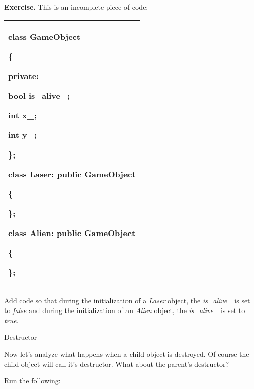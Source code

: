 \documentclass[
]{article}
\begin{document}
\textbf{Exercise.} This is an incomplete piece of code:

\begin{longtable}[]{@{}l@{}}
\toprule
\endhead
\begin{minipage}[t]{0.97\columnwidth}\raggedright
class GameObject

\{

private:

bool is\_alive\_;

int x\_;

int y\_;

\};

class Laser: public GameObject

\{

\};

class Alien: public GameObject

\{

\};\strut
\end{minipage}\tabularnewline
\bottomrule
\end{longtable}

Add code so that during the initialization of a \emph{Laser} object, the
\emph{is\_alive\_} is set to \emph{false} and during the initialization
of an \emph{Alien} object, the \emph{is\_alive\_} is set to \emph{true}.

Destructor

Now let's analyze what happens when a child object is destroyed. Of
course the child object will call it's destructor. What about the
parent's destructor?

Run the following:
\end{document}
